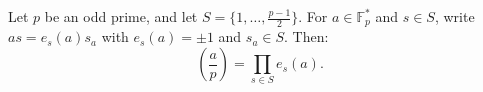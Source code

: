 Let $p$ be an odd prime, and let $S = \{1, \ldots, \frac{p-1}{2}\}$. For $a \in \mathbb{F}_p^*$ and $s \in S$, write $as = e_s(a) s_a$ with $e_s(a) = \pm 1$ and $s_a \in S$. Then:
$$\left(\frac{a}{p}\right) = \prod_{s \in S} e_s(a).$$
